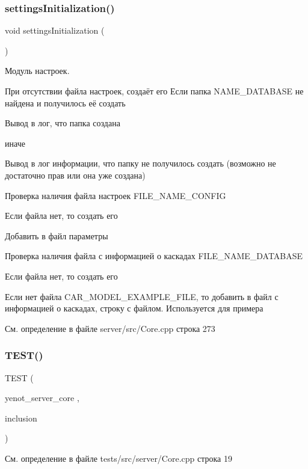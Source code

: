 \subsubsection{\texorpdfstring{settings\+Initialization()}{settingsInitialization()}}
{\footnotesize\ttfamily void settings\+Initialization (\begin{DoxyParamCaption}{ }\end{DoxyParamCaption})}



Модуль настроек. 

При отсутствии файла настроек, создаёт его Если папка N\+A\+M\+E\+\_\+\+D\+A\+T\+A\+B\+A\+SE не найдена и получилось её создать \begin{DoxyVerb}Вывод в лог, что папка создана
\end{DoxyVerb}


иначе \begin{DoxyVerb}Вывод в лог информации, что папку не получилось создать (возможно не достаточно прав или она уже создана)
\end{DoxyVerb}


Проверка наличия файла настроек F\+I\+L\+E\+\_\+\+N\+A\+M\+E\+\_\+\+C\+O\+N\+F\+IG

Если файла нет, то создать его \begin{DoxyVerb}Добавить в файл параметры
\end{DoxyVerb}


Проверка наличия файла с информацией о каскадах F\+I\+L\+E\+\_\+\+N\+A\+M\+E\+\_\+\+D\+A\+T\+A\+B\+A\+SE

Если файла нет, то создать его

Если нет файла C\+A\+R\+\_\+\+M\+O\+D\+E\+L\+\_\+\+E\+X\+A\+M\+P\+L\+E\+\_\+\+F\+I\+LE, то добавить в файл с информацией о каскадах, строку с файлом. Используется для примера 

См. определение в файле server/src/\+Core.\+cpp строка 273

\mbox{\label{group__corecpp_ga62ce880c53a3fc77fad8f0bfb8711fd9}} 
\subsubsection{\texorpdfstring{T\+E\+S\+T()}{TEST()}}
{\footnotesize\ttfamily T\+E\+ST (\begin{DoxyParamCaption}\item[{yenot\+\_\+server\+\_\+core}]{,  }\item[{inclusion}]{ }\end{DoxyParamCaption})}



См. определение в файле tests/src/server/\+Core.\+cpp строка 19

